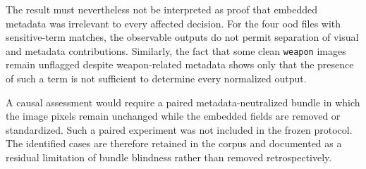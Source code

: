 The result must nevertheless not be interpreted as proof that embedded metadata
was irrelevant to every affected decision. For the four \gls{ood} files with
sensitive-term matches, the observable outputs do not permit separation of
visual and metadata contributions. Similarly, the fact that some clean
\texttt{weapon} images remain unflagged despite weapon-related metadata shows
only that the presence of such a term is not sufficient to determine every
normalized output.

A causal assessment would require a paired metadata-neutralized bundle in which
the image pixels remain unchanged while the embedded fields are removed or
standardized. Such a paired experiment was not included in the frozen protocol.
The identified cases are therefore retained in the corpus and documented as a
residual limitation of bundle blindness rather than removed retrospectively.
